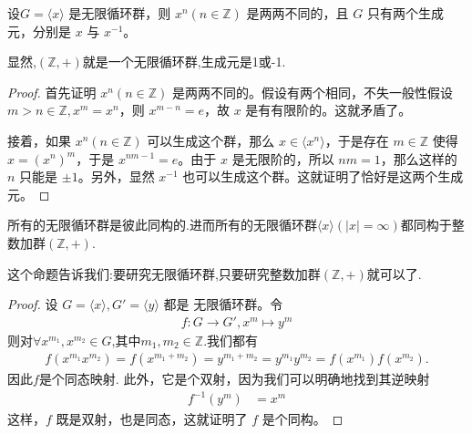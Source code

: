 \documentclass[../../main.tex]{subfiles}
\begin{document}
\begin{proposition}\label{proposition:每一个无限循环群都对应两个生成元}
设$G = \langle x\rangle$ 是无限循环群，则 $x^n(n\in\mathbb{Z})$ 是两两不同的，且 $G$ 只有两个生成元，分别是 $x$ 与 $x^{-1}$。
\end{proposition}
\begin{note}
显然,$(\mathbb{Z},+)$就是一个无限循环群,生成元是1或-1.
\end{note}
\begin{proof}
首先证明 $x^n(n\in\mathbb{Z})$ 是两两不同的。假设有两个相同，不失一般性假设 $m > n\in\mathbb{Z},x^m = x^n$，则 $x^{m - n}=e$，故 $x$ 是有有限阶的。这就矛盾了。

接着，如果 $x^n(n\in\mathbb{Z})$ 可以生成这个群，那么 $x\in\langle x^n\rangle$，于是存在 $m\in\mathbb{Z}$ 使得 $x=(x^n)^m$，于是 $x^{nm - 1}=e$。由于 $x$ 是无限阶的，所以 $nm = 1$，那么这样的 $n$ 只能是 $\pm1$。另外，显然 $x^{-1}$ 也可以生成这个群。这就证明了恰好是这两个生成元。

\end{proof}

\begin{proposition}\label{proposition:所有的无限循环群是彼此同构的}
所有的无限循环群是彼此同构的.进而所有的无限循环群$\langle x\rangle(|x|=\infty)$都同构于整数加群$(\mathbb{Z},+)$.
\end{proposition}
\begin{note}
这个命题告诉我们:要研究无限循环群,只要研究整数加群$(\mathbb{Z},+)$就可以了.
\end{note}
\begin{proof}
设 $G = \langle x\rangle, G' = \langle y\rangle$ 都是 无限循环群。令
\begin{align*}
f:G\rightarrow G'
,
x^m\mapsto y^m
\end{align*}
则对$\forall x^{m_1},x^{m_2}\in G$,其中$m_1,m_2\in \mathbb{Z}$.我们都有
\begin{align*}
f\left( x^{m_1}x^{m_2} \right) =f\left( x^{m_1+m_2} \right) =y^{m_1+m_2}=y^{m_1}y^{m_2}=f\left( x^{m_1} \right) f\left( x^{m_2} \right) .
\end{align*}
因此$f$是个同态映射.
此外，它是个双射，因为我们可以明确地找到其逆映射
\begin{align*}
f^{-1}(y^m)&=x^m
\end{align*}
这样，$f$ 既是双射，也是同态，这就证明了 $f$ 是个同构。

\end{proof}
\end{document}
